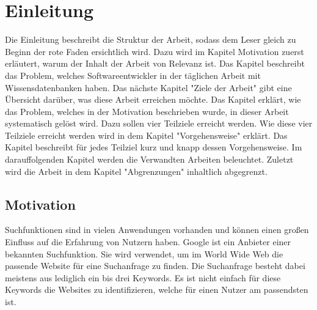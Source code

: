 \chapter{Einleitung}
\label{chap:intro}

Die Einleitung beschreibt die Struktur der Arbeit, sodass dem Leser gleich zu Beginn der rote Faden ersichtlich wird.
Dazu wird im Kapitel Motivation zuerst erläutert, warum der Inhalt der Arbeit von Relevanz ist.
Das Kapitel beschreibt das Problem, welches Softwareentwickler in der täglichen Arbeit mit Wissensdatenbanken haben.
Das nächste Kapitel "Ziele der Arbeit" gibt eine Übersicht darüber, was diese Arbeit erreichen möchte.
Das Kapitel erklärt, wie das Problem, welches in der Motivation beschrieben wurde, in dieser Arbeit systematisch gelöst wird.
Dazu sollen vier Teilziele erreicht werden.
Wie diese vier Teilziele erreicht werden wird in dem Kapitel "Vorgehensweise" erklärt.
Das Kapitel beschreibt für jedes Teilziel kurz und knapp dessen Vorgehensweise.
Im darauffolgenden Kapitel werden die Verwandten Arbeiten beleuchtet.
Zuletzt wird die Arbeit in dem Kapitel "Abgrenzungen" inhaltlich abgegrenzt.

\section{Motivation}
Suchfunktionen sind in vielen Anwendungen vorhanden und können einen großen Einfluss auf die Erfahrung von Nutzern haben.
Google ist ein Anbieter einer bekannten Suchfunktion.
Sie wird verwendet, um im World Wide Web die passende Website für eine Suchanfrage zu finden.
Die Suchanfrage besteht dabei meistens aus lediglich ein bis drei Keywords.
Es ist nicht einfach für diese Keywords die Websites zu identifizieren, welche für einen Nutzer am passendsten ist.\\

